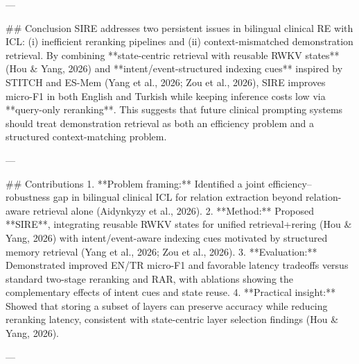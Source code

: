 ---

## Conclusion  
SIRE addresses two persistent issues in bilingual clinical RE with ICL: (i) inefficient reranking pipelines and (ii) context-mismatched demonstration retrieval. By combining **state-centric retrieval with reusable RWKV states** (Hou & Yang, 2026) and **intent/event-structured indexing cues** inspired by STITCH and ES-Mem (Yang et al., 2026; Zou et al., 2026), SIRE improves micro-F1 in both English and Turkish while keeping inference costs low via **query-only reranking**. This suggests that future clinical prompting systems should treat demonstration retrieval as both an efficiency problem and a structured context-matching problem.

---

## Contributions  
1. **Problem framing:** Identified a joint efficiency–robustness gap in bilingual clinical ICL for relation extraction beyond relation-aware retrieval alone (Aidynkyzy et al., 2026).  
2. **Method:** Proposed **SIRE**, integrating reusable RWKV states for unified retrieval+rering (Hou & Yang, 2026) with intent/event-aware indexing cues motivated by structured memory retrieval (Yang et al., 2026; Zou et al., 2026).  
3. **Evaluation:** Demonstrated improved EN/TR micro-F1 and favorable latency tradeoffs versus standard two-stage reranking and RAR, with ablations showing the complementary effects of intent cues and state reuse.  
4. **Practical insight:** Showed that storing a subset of layers can preserve accuracy while reducing reranking latency, consistent with state-centric layer selection findings (Hou & Yang, 2026).

---